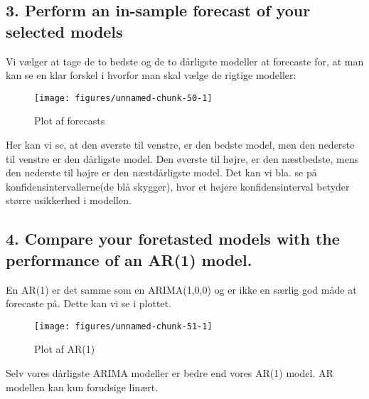 \documentclass[
  10pt,
]{article}
\begin{document}
\newpage

\hypertarget{perform-an-in-sample-forecast-of-your-selected-models}{%
\subsection{3. Perform an in-sample forecast of your selected
models}\label{perform-an-in-sample-forecast-of-your-selected-models}}

Vi vælger at tage de to bedste og de to dårligste modeller at forecaste
for, at man kan se en klar forskel i hvorfor man skal vælge de rigtige
modeller:

\begin{figure}[H]

{\centering \texttt{[image: figures/unnamed-chunk-50-1]} 

}

\caption{\label{fig:forecastplot}Plot af forecasts}\label{fig:unnamed-chunk-50}
\end{figure}

Her kan vi se, at den øverste til venstre, er den bedste model, men den
nederste til venstre er den dårligste model. Den øverste til højre, er
den næstbedste, mens den nederste til højre er den næstdårligste model.
Det kan vi bla. se på konfidensintervallerne(de blå skygger), hvor et
højere konfidensinterval betyder større usikkerhed i modellen.

\newpage

\hypertarget{compare-your-foretasted-models-with-the-performance-of-an-ar1-model.}{%
\subsection{4. Compare your foretasted models with the performance of an
AR(1)
model.}\label{compare-your-foretasted-models-with-the-performance-of-an-ar1-model.}}

En AR(1) er det samme som en ARIMA(1,0,0) og er ikke en særlig god måde
at forecaste på. Dette kan vi se i plottet.

\begin{figure}[H]

{\centering \texttt{[image: figures/unnamed-chunk-51-1]} 

}

\caption{\label{fig:AR1}Plot af AR(1)}\label{fig:unnamed-chunk-51}
\end{figure}

Selv vores dårligste ARIMA modeller er bedre end vores AR(1) model. AR
modellen kan kun forudsige linært.
\end{document}
